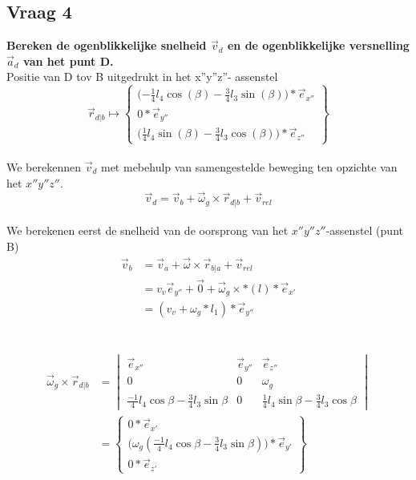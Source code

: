 \documentclass[a4paper,10pt]{article}
\begin{document}
\subsection{Vraag 4}
\textbf{Bereken de ogenblikkelijke snelheid $\vec{v}_d$ en de ogenblikkelijke versnelling $\vec{a}_d$ van het punt D.}\\
Positie van D tov B uitgedrukt in het x''y''z''- assenstel\\
\begin{equation}
	\vec{r}_{d|b} \mapsto \begin{Bmatrix}
	\Big({-\frac{1}{4}} l_4 \cos(\beta)-\frac{3}{4} l_3 \sin(\beta)\Big)*\vec{e}_{x''}\\
	0 * \vec{e}_{y''}\\
	\Big (\frac{1}{4} l_4 \sin(\beta) - \frac{3}{4} l_3 \cos(\beta)\Big) * \vec{e}_{z''}
	\end{Bmatrix}
\end{equation}\\
We berekennen $\vec{v}_d$ met mebehulp van samengestelde beweging ten opzichte van het $x''y''z''$.\\
\begin{equation}
\label{vd}
\vec{v}_d = \vec{v}_b + \vec{\omega}_g \times \vec{r}_{d|b}  +\vec{v}_{rel}
\end{equation}\\
We berekenen eerst de snelheid van de oorsprong van het $x''y''z''$-assenstel (punt B)\\
\begin{equation}
\label{vb}
\begin{aligned}
\vec{v}_b &= \vec{v}_a + \vec{\omega}\times\vec{r}_{b|a} + \vec{v}_{rel}\\
&= v_v  \vec{e}_{y''} + \vec{0} + \vec{\omega}_g \times * (l) *\vec{e}_{x'}\\
&= (v_v + \omega_g * l_1)*\vec{e}_{y''}
\end{aligned}
\end{equation}\\
\\
\begin{equation}
\label{wrd}
\begin{aligned}
\vec{\omega}_g \times \vec{r}_{d|b} & = \begin{vmatrix}
\vec{e}_{x''}& \vec{e}_{y''} & \vec{e}_{z''}\\
0 & 0 & \omega_g \\
\frac{-1}{4} l_4 \cos{\beta} - \frac{3}{4} l_3  \sin{\beta} & 0 &\frac{1}{4} l_4  \sin{\beta}-\frac{3}{4} l_3  \cos{\beta}
\end{vmatrix}\\
&= \begin{Bmatrix}
0 *\vec{e}_{x'}\\
\Big(\omega_g (\frac{-1}{4} l_4 \cos{\beta}-\frac{3}{4} l_3 \sin{\beta})\Big)*\vec{e}_{y'}\\
0 * \vec{e}_{z'}
\end{Bmatrix}
\end{aligned}
\end{equation}\\
\end{document}
